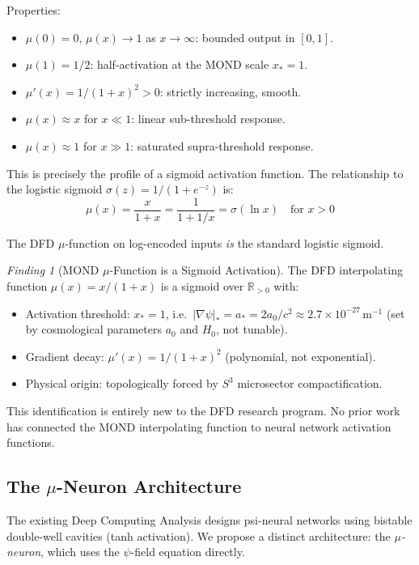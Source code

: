 \documentclass[11pt]{article}
\theoremstyle{definition}
\theoremstyle{remark}
\newtheorem{finding}[theorem]{Finding}
\begin{document}
Properties:
\begin{itemize}
\item $\mu(0) = 0$, $\mu(x) \to 1$ as $x \to \infty$: bounded output in $[0,1]$.
\item $\mu(1) = 1/2$: half-activation at the MOND scale $x_* = 1$.
\item $\mu'(x) = 1/(1+x)^2 > 0$: strictly increasing, smooth.
\item $\mu(x) \approx x$ for $x \ll 1$: linear sub-threshold response.
\item $\mu(x) \approx 1$ for $x \gg 1$: saturated supra-threshold response.
\end{itemize}

This is precisely the profile of a sigmoid activation function. The
relationship to the logistic sigmoid $\sigma(z) = 1/(1+e^{-z})$ is:
\begin{equation}
\mu(x) = \frac{x}{1+x} = \frac{1}{1 + 1/x} = \sigma(\ln x)
\quad \text{for } x > 0
\label{eq:mu_sigma_relation}
\end{equation}

The DFD $\mu$-function on log-encoded inputs \emph{is} the standard
logistic sigmoid.

\begin{finding}[MOND $\mu$-Function is a Sigmoid Activation]
\label{find:mond_sigmoid}
The DFD interpolating function $\mu(x) = x/(1+x)$ is a sigmoid over
$\mathbb{R}_{>0}$ with:
\begin{itemize}
\item Activation threshold: $x_* = 1$, i.e.\
  $|\nabla\psi|_* = a_* = 2a_0/c^2 \approx 2.7\times 10^{-27}\,\mathrm{m}^{-1}$
  (set by cosmological parameters $a_0$ and $H_0$, not tunable).
\item Gradient decay: $\mu'(x) = 1/(1+x)^2$ (polynomial, not exponential).
\item Physical origin: topologically forced by $S^3$ microsector
  compactification.
\end{itemize}
This identification is entirely new to the DFD research program.
No prior work has connected the MOND interpolating function to neural
network activation functions.
\end{finding}

\subsection{The $\mu$-Neuron Architecture}
\label{sec:mu_neuron}

The existing Deep Computing Analysis designs psi-neural networks using
bistable double-well cavities (tanh activation). We propose a distinct
architecture: the \emph{$\mu$-neuron}, which uses the $\psi$-field
equation directly.
\end{document}
